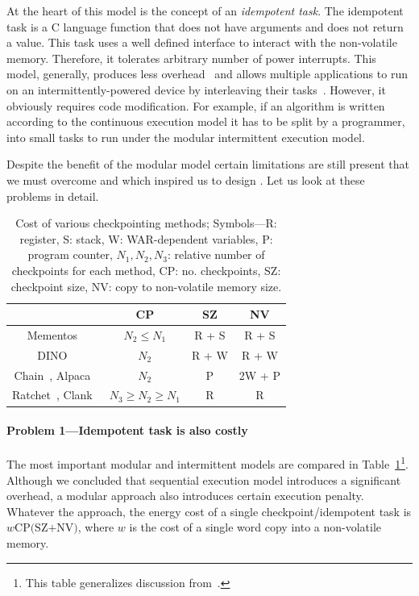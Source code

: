 At the heart of this model is the concept of an \emph{idempotent task}. The idempotent task is a C language function that does not have arguments and does not return a value. This task uses a well defined interface to interact with the non-volatile memory. Therefore, it tolerates arbitrary number of power interrupts. This model, generally, produces less overhead~\cite{chain} and allows multiple applications to run on an intermittently-powered device by interleaving their tasks~\cite{}. However, it obviously requires code modification. For example, if an algorithm is written according to the continuous execution model it has to be split by a programmer, into small tasks to run under the modular intermittent execution model.

Despite the benefit of the modular model certain limitations are still present that we must overcome and which inspired us to design \sys. Let us look at these problems in detail.

\begin{table}
	\centering
	\begin{tabular}{|c|c|c|c|}
		\hline
		{~} & CP & SZ & NV \\
		\hline\hline
		\!\!Mementos~\cite{mementos}\!\! & \!\!$N_2\leq N_1$\!\! & \!\!R + S\!\! & \!\!R + S\!\! \\
		\!\!DINO~\cite{dino}\!\! & $N_2$\!\! & \!\!R + W\!\! & \!\!R + W\!\! \\
		\!\!Chain~\cite{chain}, Alpaca~\cite{alpaca}\!\! & \!\!$N_2$\!\! & P\!\! & \!\!2W + P\!\!\\
		\!\!Ratchet~\cite{ratchet}, Clank~\cite{hicks_isca_2017}\!\! & $N_3\geq N_2\geq N_1$\!\! & \!\!R\!\! & R\!\!\\
		\hline 
	\end{tabular}
	\caption{Cost of various checkpointing methods; Symbols---R: register, S: stack, W: WAR-dependent variables, P: program counter, $N_1, N_2, N_3$: relative number of checkpoints for each method, CP: no. checkpoints, SZ: checkpoint size, NV: copy to non-volatile memory size.}
	\label{table:chechpoint_comparison}
\end{table}

\paragraph{Problem 1---Idempotent task is also costly}

The most important modular and intermittent models are compared in Table~\ref{table:chechpoint_comparison}\footnote{This table generalizes discussion from~\cite[Sec. 2.4]{alpaca}.}. Although we concluded that sequential execution model introduces a significant overhead, a modular approach also introduces certain execution penalty. Whatever the approach, the energy cost of a single checkpoint/idempotent task is $w\text{CP(SZ+NV)}$, where $w$ is the cost of a single word copy into a non-volatile memory. 


